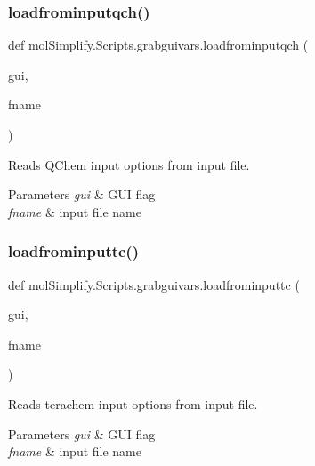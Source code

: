 \subsubsection{\texorpdfstring{loadfrominputqch()}{loadfrominputqch()}}
{\footnotesize\ttfamily def mol\+Simplify.\+Scripts.\+grabguivars.\+loadfrominputqch (\begin{DoxyParamCaption}\item[{}]{gui,  }\item[{}]{fname }\end{DoxyParamCaption})}



Reads Q\+Chem input options from input file. 


\begin{DoxyParams}{Parameters}
{\em gui} & G\+UI flag \\
\hline
{\em fname} & input file name \\
\hline
\end{DoxyParams}
\mbox{\label{namespacemolSimplify_1_1Scripts_1_1grabguivars_ac221cb0e04bd09dabecf9b5176a9ca06}} 
\subsubsection{\texorpdfstring{loadfrominputtc()}{loadfrominputtc()}}
{\footnotesize\ttfamily def mol\+Simplify.\+Scripts.\+grabguivars.\+loadfrominputtc (\begin{DoxyParamCaption}\item[{}]{gui,  }\item[{}]{fname }\end{DoxyParamCaption})}



Reads terachem input options from input file. 


\begin{DoxyParams}{Parameters}
{\em gui} & G\+UI flag \\
\hline
{\em fname} & input file name \\
\hline
\end{DoxyParams}
\mbox{\label{namespacemolSimplify_1_1Scripts_1_1grabguivars_a07e656edb58bbc9b65ef74aca290448e}} 
